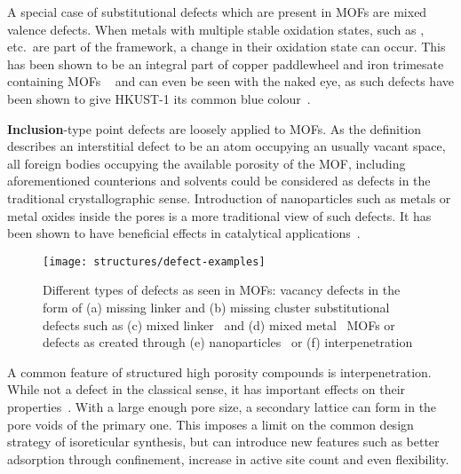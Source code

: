 A special case of substitutional defects which are present in MOFs
are mixed valence defects. When metals with multiple stable oxidation
states, such as ,  etc.\ are part of
the framework, a change in their oxidation state can occur. This has
been shown to be an integral part of copper paddlewheel and
iron trimesate containing MOFs
~\cite{yoonControlledReducibilityMetalOrganic2010} and can even be
seen with the naked eye, as such defects have been shown
to give HKUST-1 its common blue colour~\cite{mullerDefectsColorCenters2017}.

\textbf{Inclusion}-type point defects are loosely applied to MOFs.
As the definition describes an interstitial defect
to be an atom occupying an usually vacant space, all foreign
bodies occupying the available porosity of the MOF, including
aforementioned counterions and solvents could be considered as
defects in the traditional crystallographic sense.
Introduction of nanoparticles such as metals or metal oxides
inside the pores is a more traditional view of such defects.
It has been shown to have beneficial
effects in catalytical
applications~\cite{falcaroApplicationMetalMetal2016, %
    schroderRutheniumNanoparticlesPorous2008}.

\begin{figure}[tb]
	\centering

	\texttt{[image: structures/defect-examples]}
	\caption{
		Different types of defects as seen in MOFs: 
		vacancy defects in the form of (a) missing linker and 
		(b) missing cluster substitutional defects such as
		(c) mixed linker~\cite{buekenTacklingDefectConundrum2017}
		and (d) mixed metal~\cite{vuongSynthesisEngineeringPorosity2013} MOFs or defects 
		as created through (e) nanoparticles~\cite{schroderRutheniumNanoparticlesPorous2008}
		or (f) interpenetration~\cite{yaoInterpenetratedMetalOrganic2012}
	}%
	\label{def:fgr:defect-types}
\end{figure}

A common feature of structured high porosity compounds is
interpenetration. While not a defect in the classical sense,
it has important effects on their 
properties~\cite{haldarInterpenetrationCoordinationPolymers2015}.
With a large enough pore size, a secondary lattice can form in the
pore voids of the primary one. This imposes a limit on the
common design strategy of isoreticular synthesis, but can
introduce new features such as better adsorption through
confinement, increase in active site count and even flexibility.

